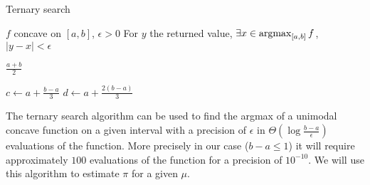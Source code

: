 \begin{algorithm}[H]
    \caption{Ternary search}
    \begin{algorithmic}[1]
    \Require $f$ concave on $[a, b]$, $\epsilon > 0$
    \Ensure For $y$ the returned value, $\exists x \in \operatorname*{argmax}_{[a, b]} f$, $|y - x| < \epsilon$
    

        \State \Return $\frac{a + b}{2}$
    \EndIf
    
    \State $c \leftarrow a + \frac{b - a}{3}$
    \State $d \leftarrow a + \frac{2(b - a)}{3}$
    
        \State \Return {}
    \Else
        \State \Return {}
    \EndIf
    \EndFunction
    
    \end{algorithmic}
    \end{algorithm}


The ternary search algorithm can be used to find the argmax of a unimodal  concave function on a given interval with a precision of $\epsilon$ in $\Theta(\log \frac{b - a}{\epsilon})$ evaluations of the function. More precisely in our case ($b - a \leq 1$) it will require approximately $100$ evaluations of the function for a precision of $10^{-10}$.
We will use this algorithm to estimate $\pi$ for a given $\mu$.


